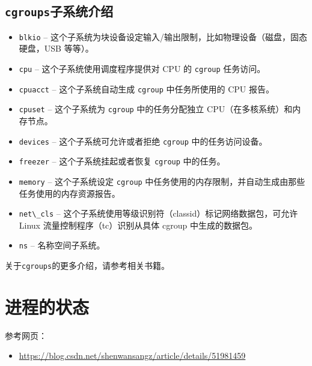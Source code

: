 \documentclass[doctor,openright,twoside]{sjtuthesis}
\providecommand{\tightlist}{%
    \setlength{\itemsep}{0pt}\setlength{\parskip}{0pt}}
\newcommand{\passthrough}[1]{#1}
\theoremstyle{plain}
\theoremstyle{definition}
\theoremstyle{remark}
\theoremstyle{ocrenumbox}
\theoremstyle{plain}
\begin{document}
\hypertarget{cgroups-4}{%
\subsection{\texorpdfstring{\texttt{cgroups}子系统介绍}{cgroups子系统介绍}}\label{cgroups-4}}

\begin{itemize}
\tightlist
\item
  \passthrough{\lstinline!blkio!} -- 这个子系统为块设备设定输入/输出限制，比如物理设备（磁盘，固态硬盘，USB 等等）。
\item
  \passthrough{\lstinline!cpu!} -- 这个子系统使用调度程序提供对 CPU 的 \passthrough{\lstinline!cgroup!} 任务访问。
\item
  \passthrough{\lstinline!cpuacct!} -- 这个子系统自动生成 \passthrough{\lstinline!cgroup!} 中任务所使用的 CPU 报告。
\item
  \passthrough{\lstinline!cpuset!} -- 这个子系统为 \passthrough{\lstinline!cgroup!} 中的任务分配独立 CPU（在多核系统）和内存节点。
\item
  \passthrough{\lstinline!devices!} -- 这个子系统可允许或者拒绝 \passthrough{\lstinline!cgroup!} 中的任务访问设备。
\item
  \passthrough{\lstinline!freezer!} -- 这个子系统挂起或者恢复 \passthrough{\lstinline!cgroup!} 中的任务。
\item
  \passthrough{\lstinline!memory!} -- 这个子系统设定 \passthrough{\lstinline!cgroup!} 中任务使用的内存限制，并自动生成由那些任务使用的内存资源报告。
\item
  \passthrough{\lstinline!net\_cls!} -- 这个子系统使用等级识别符（classid）标记网络数据包，可允许 Linux 流量控制程序（tc）识别从具体 cgroup 中生成的数据包。
\item
  \passthrough{\lstinline!ns!} -- 名称空间子系统。
\end{itemize}

关于\passthrough{\lstinline!cgroups!}的更多介绍，请参考相关书籍。

\hypertarget{section-98}{%
\section{进程的状态}\label{section-98}}

参考网页：

\begin{itemize}
\tightlist
\item
  \url{https://blog.csdn.net/shenwansangz/article/details/51981459}
\end{itemize}
\end{document}
